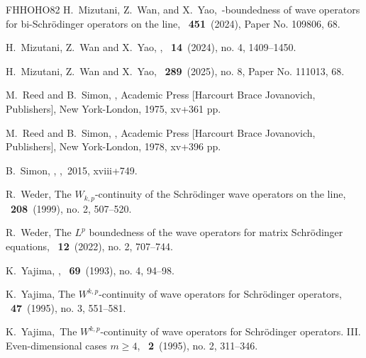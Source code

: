 \documentclass[reqno]{amsart}
\numberwithin{equation}{section}
\begin{document}
\begin{thebibliography}{FHHOHO82}
H.~{Mizutani}, Z.~{Wan}, and X.~{Yao},~-boundedness of wave operators for bi-{S}chr\"odinger operators on the line,
~{\bf 451}~(2024), Paper No. 109806, 68.

H.~Mizutani, Z.~Wan and X.~Yao,
,
~{\bf14}~(2024), no. 4, 1409--1450.

H.~Mizutani, Z.~Wan and X.~Yao,
~{\bf289}~(2025), no. 8, Paper No. 111013, 68.

M.~Reed and B.~Simon,
,
\newblock Academic Press [Harcourt Brace Jovanovich, Publishers], New York-London, 1975, xv+361 pp.

M.~Reed and B.~Simon,
,
\newblock Academic Press [Harcourt Brace Jovanovich, Publishers], New York-London, 1978, xv+396 pp.

B.~Simon,
,
,~2015, xviii+749.

R.~Weder,
\newblock The {$W_{k,p}$}-continuity of the {S}chr\"{o}dinger wave operators on
  the line,
~{\bf208}~(1999), no. 2, 507--520.

R.~Weder,
\newblock The {$L^p$} boundedness of the wave operators for matrix
{S}chr\"{o}dinger equations,
~{\bf12}~(2022), no. 2, 707--744.

K.~Yajima,
,
~{\bf69}~(1993), no. 4, 94--98.

K.~Yajima,
\newblock The {$W^{k,p}$}-continuity of wave operators for {S}chr\"{o}dinger
  operators,
~{\bf47}~(1995), no. 3, 551--581.

K.~Yajima,~The {$W^{k,p}$}-continuity of wave operators for {S}chr\"{o}dinger
  operators. {III}. {E}ven-dimensional cases {$m\geq 4$},
~{\bf2}~(1995), no. 2, 311--346.


\end{thebibliography}
\end{document}
